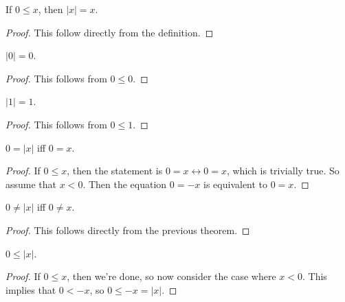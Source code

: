 \documentclass[../../math.tex]{subfiles}
\begin{document}
\begin{theorem} \label{abs_pos_eq}
    If $0 \leq x$, then $|x| = x$.
\end{theorem}
\begin{proof}
    This follow directly from the definition.
\end{proof}

\begin{theorem}
    $|0| = 0$.
\end{theorem}
\begin{proof}
    This follows from $0 \leq 0$.
\end{proof}

\begin{theorem}
    $|1| = 1$.
\end{theorem}
\begin{proof}
    This follows from $0 \leq 1$.
\end{proof}

\begin{theorem}
    $0 = |x|$ iff $0 = x$.
\end{theorem}
\begin{proof}
    If $0 \leq x$, then the statement is $0 = x \leftrightarrow 0 = x$, which is
    trivially true.  So assume that $x < 0$.  Then the equation $0 = -x$ is
    equivalent to $0 = x$.
\end{proof}

\begin{theorem}
    $0 \neq |x|$ iff $0 \neq x$.
\end{theorem}
\begin{proof}
    This follows directly from the previous theorem.
\end{proof}

\begin{theorem}
    $0 \leq |x|$.
\end{theorem}
\begin{proof}
    If $0 \leq x$, then we're done, so now consider the case where $x < 0$.
    This implies that $0 < -x$, so $0 \leq -x = |x|$.
\end{proof}
\end{document}
